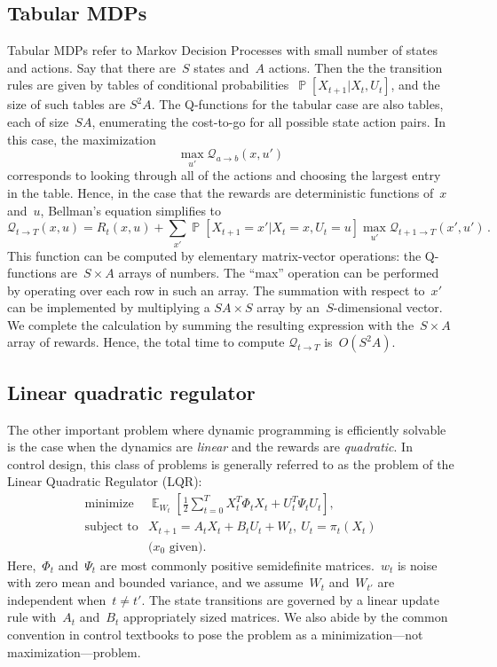 \documentclass{tufte-book}
\begin{document}
\hypertarget{tabular-mdps}{%
\subsection{Tabular MDPs}\label{tabular-mdps}}

Tabular MDPs refer to Markov Decision Processes with small number of
states and actions. Say that there are~\(S\) states and~\(A\) actions.
Then the the transition rules are given by tables of conditional
probabilities~\(\mathop\mathbb{P}[X_{t+1}|X_t,U_t]\), and the size of
such tables are \(S^2 A\). The Q-functions for the tabular case are also
tables, each of size~\(SA\), enumerating the cost-to-go for all possible
state action pairs. In this case, the maximization \[
 \max_{u'}\mathcal{Q}_{a\rightarrow b}(x,u')
\] corresponds to looking through all of the actions and choosing the
largest entry in the table. Hence, in the case that the rewards are
deterministic functions of~\(x\) and~\(u\), Bellman's equation
simplifies to \[
    \mathcal{Q}_{t\rightarrow T}(x,u) = R_t(x,u) + \sum_{x'} \mathop\mathbb{P}[X_{t+1}=x'|X_t=x,U_t=u] \max_{u'} \mathcal{Q}_{t+1\rightarrow T}(x',u')\,.
\] This function can be computed by elementary matrix-vector operations:
the Q-functions are~\(S \times A\) arrays of numbers. The ``max''
operation can be performed by operating over each row in such an array.
The summation with respect to~\(x'\) can be implemented by multiplying a
\(SA \times S\) array by an~\(S\)-dimensional vector. We complete the
calculation by summing the resulting expression with the~\(S\times A\)
array of rewards. Hence, the total time to compute
\(\mathcal{Q}_{t\rightarrow T}\) is~\(O(S^2A)\).

\hypertarget{linear-quadratic-regulator}{%
\subsection{Linear quadratic
regulator}\label{linear-quadratic-regulator}}

The other important problem where dynamic programming is efficiently
solvable is the case when the dynamics are \emph{linear} and the rewards
are \emph{quadratic}. In control design, this class of problems is
generally referred to as the problem of the Linear Quadratic Regulator
(LQR): \[
\begin{array}{ll}
\text{minimize} \, & \mathop\mathbb{E}_{W_t} \left[\frac{1}{2}\sum_{t=0}^T X_t^T \Phi_t X_t + U_t^T \Psi_t U_t\right], \\
\text{subject to} & X_{t+1} = A_t X_t+ B_t U_t + W_t,~U_t=\pi_t(X_t) \\
& \text{($x_0$ given).}
\end{array}
\] Here,~\(\Phi_t\) and~\(\Psi_t\) are most commonly positive
semidefinite matrices.~\(w_t\) is noise with zero mean and bounded
variance, and we assume~\(W_t\) and~\(W_{t'}\) are independent
when~\(t\neq t'\). The state transitions are governed by a linear update
rule with~\(A_t\) and~\(B_t\) appropriately sized matrices. We also
abide by the common convention in control textbooks to pose the problem
as a minimization---not maximization---problem.
\end{document}

